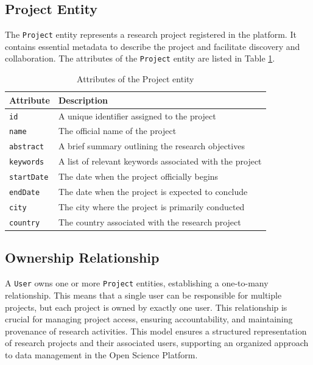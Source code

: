 \documentclass{article}
\begin{document}
\subsection{Project Entity}
The \texttt{Project} entity represents a research project registered in the platform. It contains essential metadata to describe the project and facilitate discovery and collaboration. The attributes of the \texttt{Project} entity are listed in Table \ref{tab:project_attributes}.

\begin{table}[h]
    \centering
    \caption{Attributes of the Project entity}
    \label{tab:project_attributes}
    \begin{tabular}{|l|l|}
        \hline
        \textbf{Attribute} & \textbf{Description}                                    \\ \hline
        \texttt{id}        & A unique identifier assigned to the project             \\ \hline
        \texttt{name}      & The official name of the project                        \\ \hline
        \texttt{abstract}  & A brief summary outlining the research objectives       \\ \hline
        \texttt{keywords}  & A list of relevant keywords associated with the project \\ \hline
        \texttt{startDate} & The date when the project officially begins             \\ \hline
        \texttt{endDate}   & The date when the project is expected to conclude       \\ \hline
        \texttt{city}      & The city where the project is primarily conducted       \\ \hline
        \texttt{country}   & The country associated with the research project        \\ \hline
    \end{tabular}
\end{table}

\subsection{Ownership Relationship}
A \texttt{User} owns one or more \texttt{Project} entities, establishing a one-to-many relationship. This means that a single user can be responsible for multiple projects, but each project is owned by exactly one user. This relationship is crucial for managing project access, ensuring accountability, and maintaining provenance of research activities. This model ensures a structured representation of research projects and their associated users, supporting an organized approach to data management in the Open Science Platform.
\end{document}
